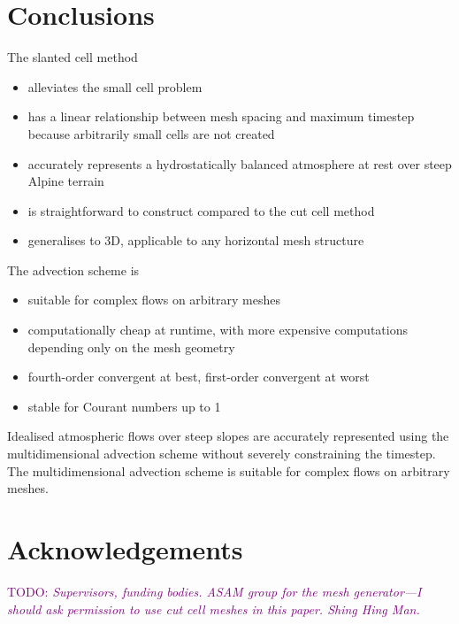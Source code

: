 \documentclass{article}
\newcommand{\TODO}[1]{\textcolor{purple}{TODO: \emph{#1}}}
\begin{document}
\section{Conclusions}

The slanted cell method
\begin{itemize}
	\item alleviates the small cell problem
	\item has a linear relationship between mesh spacing and maximum timestep because arbitrarily small cells are not created
	\item accurately represents a hydrostatically balanced atmosphere at rest over steep Alpine terrain
	\item is straightforward to construct compared to the cut cell method
	\item generalises to 3D, applicable to any horizontal mesh structure
\end{itemize}

The advection scheme is
\begin{itemize}
	\item suitable for complex flows on arbitrary meshes
	\item computationally cheap at runtime, with more expensive computations depending only on the mesh geometry
	\item fourth-order convergent at best, first-order convergent at worst
	\item stable for Courant numbers up to 1
\end{itemize}

Idealised atmospheric flows over steep slopes are accurately represented using the multidimensional advection scheme without severely constraining the timestep.  The multidimensional advection scheme is suitable for complex flows on arbitrary meshes.

\section{Acknowledgements}
\TODO{Supervisors, funding bodies.  ASAM group for the mesh generator---I should ask permission to use cut cell meshes in this paper.  Shing Hing Man.}



\end{document}
